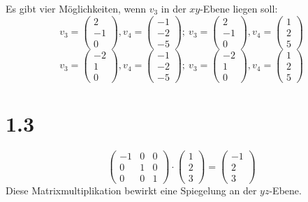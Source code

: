 \documentclass[a4paper]{scrartcl}
\begin{document}
Es gibt vier Möglichkeiten, wenn $v_3$ in der $xy$-Ebene liegen soll:\\
\[
	v_3 = \begin{pmatrix} 2 \\ -1 \\ 0 \end{pmatrix}, v_4 = \begin{pmatrix} -1 \\ -2 \\ -5 \end{pmatrix};\
	v_3 = \begin{pmatrix} 2 \\ -1 \\ 0 \end{pmatrix}, v_4 = \begin{pmatrix} 1 \\ 2 \\ 5 \end{pmatrix}\]
\[
	v_3 = \begin{pmatrix} -2 \\ 1 \\ 0 \end{pmatrix}, v_4 = \begin{pmatrix} -1 \\ -2 \\ -5 \end{pmatrix};\
	v_3 = \begin{pmatrix} -2 \\ 1 \\ 0 \end{pmatrix}, v_4 = \begin{pmatrix} 1 \\ 2 \\ 5 \end{pmatrix}
\]

\section*{1.3}
\[
	\begin{pmatrix}
	-1 & 0 & 0\\
	0 & 1 & 0 \\
	0 & 0 & 1
	\end{pmatrix} \cdot
	\begin{pmatrix}
	1 \\ 2 \\ 3
	\end{pmatrix}=
	\begin{pmatrix}
	-1 \\ 2 \\ 3
	\end{pmatrix}
\]
Diese Matrixmultiplikation bewirkt eine Spiegelung an der $yz$-Ebene.
\end{document}

